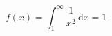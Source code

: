 \documentclass{article}
\begin{document}
\lipsum[1]
\[ f(x)=\int_1^\infty \frac1{x^2}\,\mathrm dx=1 \]
\itshape\lipsum[2]
\end{document}
